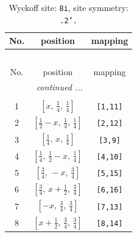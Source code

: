 \documentclass[fleqn,8pt]{jsarticle}
\begin{document}
\begin{longtable}{ccc}
\caption{Wyckoff site: {\tt 8i}, site symmetry: {\tt .2'.}}
 \\
 \hline \hline
No. & position & mapping \\ \hline \endfirsthead

\multicolumn{2}{l}{\tablename\ \thetable{}} \\
 \hline \hline
No. & position & mapping \\ \hline \endhead

 \hline \hline
\multicolumn{2}{r}{\footnotesize\it continued ...} \\ \endfoot

 \hline \hline
\multicolumn{2}{r}{} \\ \endlastfoot

1 & $\left[ x,\, \frac{1}{4},\, \frac{1}{4} \right]$ & {\tt [1,11]} \\ \hline
2 & $\left[ \frac{1}{2} - x,\, \frac{1}{4},\, \frac{1}{4} \right]$ & {\tt [2,12]} \\ \hline
3 & $\left[ \frac{1}{4},\, x,\, \frac{1}{4} \right]$ & {\tt [3,9]} \\ \hline
4 & $\left[ \frac{1}{4},\, \frac{1}{2} - x,\, \frac{1}{4} \right]$ & {\tt [4,10]} \\ \hline
5 & $\left[ \frac{3}{4},\, - x,\, \frac{3}{4} \right]$ & {\tt [5,15]} \\ \hline
6 & $\left[ \frac{3}{4},\, x + \frac{1}{2},\, \frac{3}{4} \right]$ & {\tt [6,16]} \\ \hline
7 & $\left[ - x,\, \frac{3}{4},\, \frac{3}{4} \right]$ & {\tt [7,13]} \\ \hline
8 & $\left[ x + \frac{1}{2},\, \frac{3}{4},\, \frac{3}{4} \right]$ & {\tt [8,14]} \\
\end{longtable}
\renewcommand{\arraystretch}{1.2}
\end{document}
